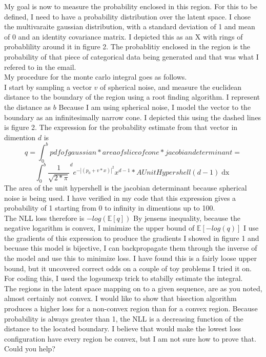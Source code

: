 \documentclass[12pt]{article}
\begin{document}
My goal is now to measure the probability enclosed in this region. For this to be defined, I need to have a probability distribution over the latent space. I chose the multivaraite gaussian distribution, with a standard deviation of 1 and mean of 0 and an identity covariance matrix. I depicted this as an X with rings of probablility around it in figure 2. The probablitiy enclosed in the region is the probability of that piece of categorical data being generated and that was what I refered to in the email. 
\\
My procedure for the monte carlo integral goes as follows. 
\\
I start by sampling a vector $v$ of spherical noise, and measure the euclidean distance to the boundary of the region using a root finding algorithm. I represent the distance as $b$ Because I am using spherical noise, I model the vector to the boundary as an infinitesimally narrow cone. I depicted this using the dashed lines is figure 2. 
The expression for the probability estimate from that vector in dimention $d$ is $$q=\int_0^b pdf of gaussian*area ofslice of cone *jacobian determinant = $$ $$ \int_0^b {\frac{1}{\sqrt{2*\pi}}}^d e^{-|(p_0+v*x)|^2} x^{d-1}*A  Unit Hypershell(d-1) \mathop{dx}$$
The area of the unit hypershell is the jacobian determinant because spherical noise is being used. I have verified in my code that this expression gives a probability of 1 starting from 0 to infinity in dimentions up to 100. \\
The NLL loss therefore is $-log(\mathbb{E}[q])$ By jensens inequality, because the negative logarithm is convex, I minimize the upper bound of $\mathbb{E}[-log(q)]$
I use the gradients of this expression to produce the gradients I showed in figure 1 and becuase this model is bijective, I can backpropagate them through the inverse of the model and use this to minimize loss. I have found this is a fairly loose upper bound, but it uncovered correct odds on a couple of toy problems I tried it on. For coding this, I used the logsumexp trick to stabilly estimate the integral. \\
The regions in the latent space mapping on to a given sequence, are as you noted, almost certainly not convex. I would like to show that bisection algorithm produces a higher loss for a non-convex region than for a convex region. Because probability is always greater than 1, the NLL is a decreasing function of the distance to the located boundary. I believe that would make the lowest loss configuration have every region be convex, but I am not sure how to prove that. Could you help?
\end{document}
